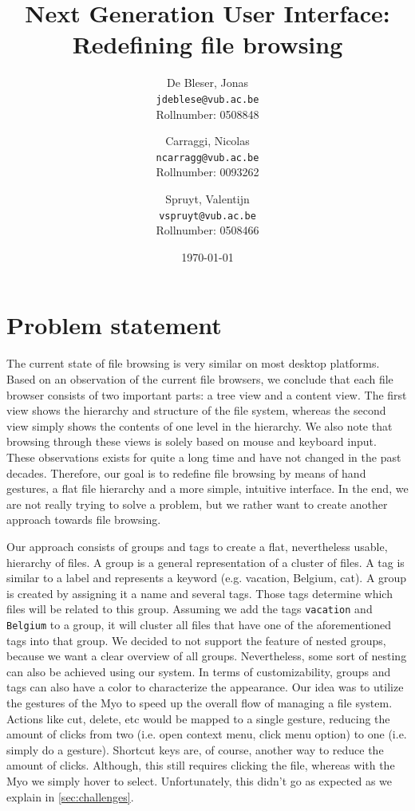 \documentclass{article}
\title{Next Generation User Interface: \\Redefining file browsing}
\author{
  De Bleser, Jonas\\
  \texttt{jdeblese@vub.ac.be}\\
  Rollnumber: 0508848
  \and
  Carraggi, Nicolas\\
  \texttt{ncarragg@vub.ac.be}\\
  Rollnumber: 0093262
  \and
  Spruyt, Valentijn\\
  \texttt{vspruyt@vub.ac.be}\\
  Rollnumber: 0508466
}
\date{\today}
\begin{document}
\maketitle


\tableofcontents

\section{Problem statement}
The current state of file browsing is very similar on most desktop platforms. Based on an observation of the current file browsers, we conclude that each file browser consists of two important parts: a tree view and a content view. The first view shows the hierarchy and structure of the file system, whereas the second view simply shows the contents of one level in the hierarchy.  We also note that browsing through these views is solely based on mouse and keyboard input. These observations exists for quite a long time and have not changed in the past decades. Therefore, our goal is to redefine file browsing by means of hand gestures, a flat file hierarchy and a more simple, intuitive interface. In the end, we are not really trying to solve a problem, but we rather want to create another approach towards file browsing.

Our approach consists of groups and tags to create a flat, nevertheless usable, hierarchy of files. A group is a general representation of a cluster of files. A tag is similar to a label and represents a keyword (e.g. vacation, Belgium, cat). A group is created by assigning it a name and several tags. Those tags determine which files will be related to this group. Assuming we add the tags \texttt{vacation} and \texttt{Belgium} to a group, it will cluster all files that have one of the aforementioned tags into that group. We decided to not support the feature of nested groups, because we want a clear overview of all groups. Nevertheless, some sort of nesting can also be achieved using our system. In terms of customizability, groups and tags can also have a color to characterize the appearance. Our idea was to utilize the gestures of the Myo to speed up the overall flow of managing a file system. Actions like cut, delete, etc would be mapped to a single gesture, reducing the amount of clicks from two (i.e. open context menu, click menu option) to one (i.e. simply do a gesture). Shortcut keys are, of course, another way to reduce the amount of clicks. Although, this still requires clicking the file, whereas with the Myo we simply hover to select. Unfortunately, this didn't go as expected as we explain in \ref{sec:challenges}.
\end{document}
